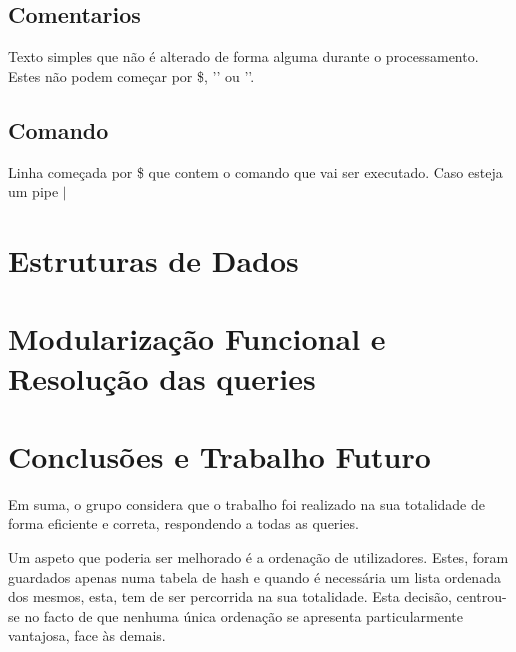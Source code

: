 \documentclass[10pt,a4paper]{article}
\begin{document}
    \subsection{Comentarios}
        Texto simples que não é alterado de forma alguma durante o
        processamento. Estes não podem começar por \$, '\outputStart' ou
        '\outputEnd'.
    \subsection{Comando}
        Linha começada por \$ que contem o comando que vai ser executado.
        Caso esteja um pipe $|$

\section{Estruturas de Dados}

\section{Modularização Funcional e Resolução das queries}

\section{Conclusões e Trabalho Futuro}
    Em suma, o grupo considera que o trabalho foi realizado na sua
    totalidade de forma eficiente e correta, respondendo a todas as queries.

    Um aspeto que poderia ser melhorado é a ordenação de utilizadores. Estes,
    foram guardados apenas numa tabela de hash e quando é necessária um lista
    ordenada dos mesmos, esta, tem de ser percorrida na sua totalidade. Esta
    decisão, centrou-se no facto de que nenhuma única ordenação se apresenta
    particularmente vantajosa, face às demais.
\end{document}

